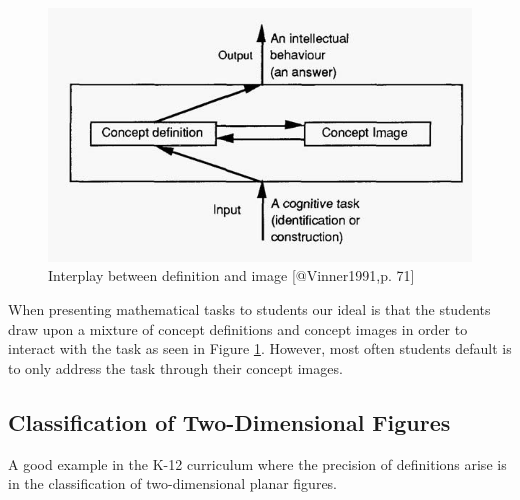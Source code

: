 \documentclass[
]{book}
\theoremstyle{definition}
\theoremstyle{definition}
\theoremstyle{definition}
\theoremstyle{definition}
\theoremstyle{remark}
\begin{document}
\begin{figure}

{\centering \includegraphics{images/concept-image} 

}

\caption{Interplay between definition and image [@Vinner1991,p. 71]}\label{fig:concept-image}
\end{figure}

When presenting mathematical tasks to students our ideal is that the students draw upon a mixture of concept definitions and concept images in order to interact with the task as seen in Figure \ref{fig:concept-image}. However, most often students default is to only address the task through their concept images.

\hypertarget{classification-of-two-dimensional-figures}{%
\subsection{Classification of Two-Dimensional Figures}\label{classification-of-two-dimensional-figures}}

A good example in the K-12 curriculum where the precision of definitions arise is in the classification of two-dimensional planar figures.
\end{document}
